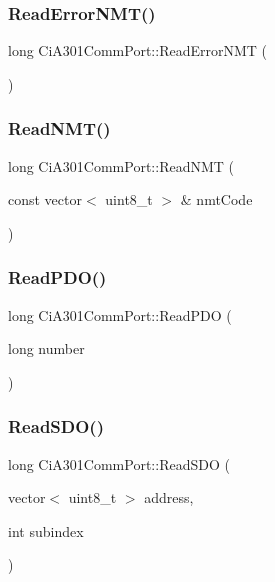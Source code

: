 \subsubsection{\texorpdfstring{Read\+Error\+N\+M\+T()}{ReadErrorNMT()}}
{\footnotesize\ttfamily long Ci\+A301\+Comm\+Port\+::\+Read\+Error\+N\+MT (\begin{DoxyParamCaption}{ }\end{DoxyParamCaption})}

\mbox{\label{classCiA301CommPort_a02df85ed5140d0d7a57fe0d2f6e47ea1}} 
\subsubsection{\texorpdfstring{Read\+N\+M\+T()}{ReadNMT()}}
{\footnotesize\ttfamily long Ci\+A301\+Comm\+Port\+::\+Read\+N\+MT (\begin{DoxyParamCaption}\item[{const vector$<$ uint8\+\_\+t $>$ \&}]{nmt\+Code }\end{DoxyParamCaption})}

\mbox{\label{classCiA301CommPort_a827f3e594b9f1e57a7b7ccb8a278404a}} 
\subsubsection{\texorpdfstring{Read\+P\+D\+O()}{ReadPDO()}}
{\footnotesize\ttfamily long Ci\+A301\+Comm\+Port\+::\+Read\+P\+DO (\begin{DoxyParamCaption}\item[{long}]{number }\end{DoxyParamCaption})}

\mbox{\label{classCiA301CommPort_a0fd0920052684589bc37bb898dcdd758}} 
\subsubsection{\texorpdfstring{Read\+S\+D\+O()}{ReadSDO()}\hspace{0.1cm}{\footnotesize\ttfamily [1/2]}}
{\footnotesize\ttfamily long Ci\+A301\+Comm\+Port\+::\+Read\+S\+DO (\begin{DoxyParamCaption}\item[{vector$<$ uint8\+\_\+t $>$}]{address,  }\item[{int}]{subindex }\end{DoxyParamCaption})}

